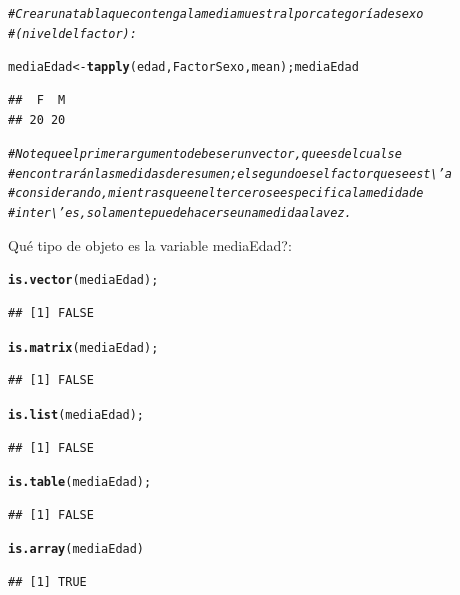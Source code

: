 \documentclass[12pt,letterpaper]{article}\usepackage[]{graphicx}\usepackage[]{color}
\makeatletter
\newcommand{\hlcom}[1]{\textcolor[rgb]{0.678,0.584,0.686}{\textit{#1}}}%
\newcommand{\hlstd}[1]{\textcolor[rgb]{0.345,0.345,0.345}{#1}}%
\newcommand{\hlkwb}[1]{\textcolor[rgb]{0.69,0.353,0.396}{#1}}%
\newcommand{\hlkwd}[1]{\textcolor[rgb]{0.737,0.353,0.396}{\textbf{#1}}}%
\newenvironment{kframe}{%
 \def\at@end@of@kframe{}%
 \ifinner\ifhmode%
  \def\at@end@of@kframe{\end{minipage}}%
  \begin{minipage}{\columnwidth}%
 \fi\fi%
 \def\FrameCommand##1{\hskip\@totalleftmargin \hskip-\fboxsep
 \colorbox{shadecolor}{##1}\hskip-\fboxsep
     \hskip-\linewidth \hskip-\@totalleftmargin \hskip\columnwidth}%
 \MakeFramed {\advance\hsize-\width
   \@totalleftmargin\z@ \linewidth\hsize
   \@setminipage}}%
 {\par\unskip\endMakeFramed%
 \at@end@of@kframe}
\newenvironment{knitrout}{}{} %
\makeatother
\begin{document}
\begin{knitrout}
\color{fgcolor}\begin{kframe}
\begin{alltt}
\hlcom{# Crear una tabla que contenga la media muestralpor categoría de sexo }
\hlcom{#(nivel del factor):}

\hlstd{mediaEdad} \hlkwb{<-} \hlkwd{tapply}\hlstd{(edad, FactorSexo, mean); mediaEdad}
\end{alltt}
\begin{verbatim}
##  F  M 
## 20 20
\end{verbatim}
\begin{alltt}
\hlcom{# Note que el primer argumento debe ser un vector, que es del cual se }
\hlcom{#encontrarán las medidas de resumen; el segundo es el factor que se est\textbackslash{}'a}
\hlcom{#considerando, mientras que en el tercero se especifica la medida de}
\hlcom{# inter\textbackslash{}'es, solamente puede hacerse una medida a la vez. }
\end{alltt}
\end{kframe}
\end{knitrout}

\¿Qu\'e tipo de objeto es la variable mediaEdad?: 
\begin{knitrout}
\color{fgcolor}\begin{kframe}
\begin{alltt}
\hlkwd{is.vector}\hlstd{(mediaEdad);}
\end{alltt}
\begin{verbatim}
## [1] FALSE
\end{verbatim}
\begin{alltt}
\hlkwd{is.matrix}\hlstd{(mediaEdad);}
\end{alltt}
\begin{verbatim}
## [1] FALSE
\end{verbatim}
\begin{alltt}
\hlkwd{is.list}\hlstd{(mediaEdad);}
\end{alltt}
\begin{verbatim}
## [1] FALSE
\end{verbatim}
\begin{alltt}
\hlkwd{is.table}\hlstd{(mediaEdad);}
\end{alltt}
\begin{verbatim}
## [1] FALSE
\end{verbatim}
\begin{alltt}
\hlkwd{is.array}\hlstd{(mediaEdad)}
\end{alltt}
\begin{verbatim}
## [1] TRUE
\end{verbatim}
\end{kframe}
\end{knitrout}
\end{document}
